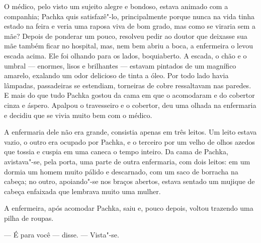 O médico, pelo visto um sujeito alegre e bondoso, estava animado com a
companhia; Pachka quis satisfazê"-lo, principalmente porque nunca na vida
tinha estado na feira e veria uma raposa viva de bom grado, mas como se
viraria sem a mãe? Depois de ponderar um pouco, resolveu pedir ao doutor
que deixasse sua mãe também ficar no hospital, mas, nem bem abriu a
boca, a enfermeira o levou escada acima. Ele foi olhando para os lados,
boquiaberto. A escada, o chão e o umbral --- enormes, lisos e brilhantes
--- estavam pintados de um magnífico amarelo, exalando um odor delicioso
de tinta a óleo. Por todo lado havia lâmpadas, passadeiras se estendiam,
torneiras de cobre ressaltavam nas paredes. E mais do que tudo Pachka
gostou da cama em que o acomodaram e do cobertor cinza e áspero. Apalpou
o travesseiro e o cobertor, deu uma olhada na enfermaria e decidiu que
se vivia muito bem com o médico.

A enfermaria dele não era grande, consistia apenas em três leitos. Um
leito estava vazio, o outro era ocupado por Pachka, e o terceiro por um
velho de olhos azedos que tossia e cuspia em uma caneca o tempo inteiro.
Da cama de Pachka, avistava"-se, pela porta, uma parte de outra
enfermaria, com dois leitos: em um dormia um homem muito pálido e
descarnado, com um saco de borracha na cabeça; no outro, apoiando"-se nos
braços abertos, estava sentado um mujique de cabeça enfaixada que
lembrava muito uma mulher.

A enfermeira, após acomodar Pachka, saiu e, pouco depois, voltou
trazendo uma pilha de roupas.

--- É para você --- disse. --- Vista"-se.

